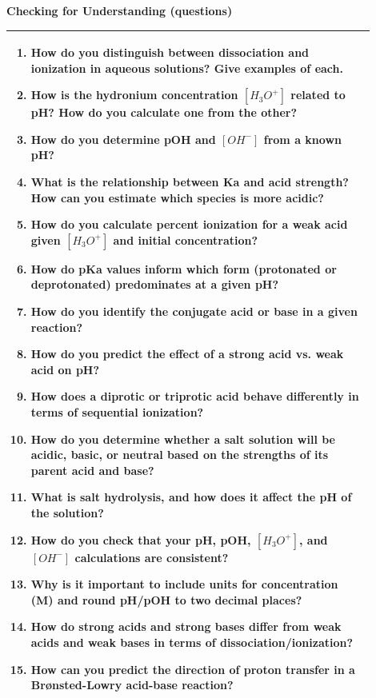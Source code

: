 \documentclass{article}
\begin{document}
\newpage
\noindent
{\large\textbf{Checking for Understanding (questions)}}\\[0.2em]
\noindent
\begin{tabular}{|p{0.9\linewidth}|}
\hline
\begin{enumerate}
    \item How do you distinguish between dissociation and ionization in aqueous solutions? Give examples of each.  
    \item How is the hydronium concentration \([H_3O^+]\) related to pH? How do you calculate one from the other?  
    \item How do you determine pOH and \([OH^-]\) from a known pH?  
    \item What is the relationship between Ka and acid strength? How can you estimate which species is more acidic?  
    \item How do you calculate percent ionization for a weak acid given \([H_3O^+]\) and initial concentration?  
    \item How do pKa values inform which form (protonated or deprotonated) predominates at a given pH?  
    \item How do you identify the conjugate acid or base in a given reaction?  
    \item How do you predict the effect of a strong acid vs. weak acid on pH?  
    \item How does a diprotic or triprotic acid behave differently in terms of sequential ionization?  
    \item How do you determine whether a salt solution will be acidic, basic, or neutral based on the strengths of its parent acid and base?  
    \item What is salt hydrolysis, and how does it affect the pH of the solution?  
    \item How do you check that your pH, pOH, \([H_3O^+]\), and \([OH^-]\) calculations are consistent?  
    \item Why is it important to include units for concentration (M) and round pH/pOH to two decimal places?  
    \item How do strong acids and strong bases differ from weak acids and weak bases in terms of dissociation/ionization?  
    \item How can you predict the direction of proton transfer in a Brønsted-Lowry acid-base reaction?  
\end{enumerate} \\
\hline  
\end{tabular}
\end{document}
